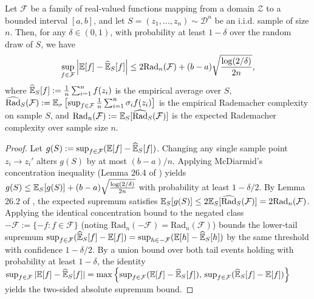 \begin{theorem}\label{thm:rademacher_gen}
Let $\mathcal{F}$ be a family of real-valued functions mapping from a domain $\mathcal{Z}$ to a bounded interval $[a, b]$, and let $S = (z_1, \dots, z_n) \sim \mathcal{D}^n$ be an i.i.d. sample of size $n$. Then, for any $\delta \in (0,1)$, with probability at least $1-\delta$ over the random draw of $S$, we have
\begin{equation*}
    \sup_{f \in \mathcal{F}} \left| \mathbb{E}[f] - \widehat{\mathbb{E}}_S[f] \right| \le 2\mathrm{Rad}_n(\mathcal{F}) + (b-a)\sqrt{\frac{\log(2/\delta)}{2n}},
\end{equation*}
where $\widehat{\mathbb{E}}_S[f] := \frac{1}{n}\sum_{i=1}^n f(z_i)$ is the empirical average over $S$, $\widehat{\mathrm{Rad}}_S(\mathcal{F}) := \mathbb{E}_{\sigma}\left[ \sup_{f \in \mathcal{F}} \frac{1}{n}\sum_{i=1}^n \sigma_i f(z_i) \right]$ is the empirical Rademacher complexity on sample $S$, and $\mathrm{Rad}_n(\mathcal{F}) := \mathbb{E}_S[\widehat{\mathrm{Rad}}_S(\mathcal{F})]$ is the expected Rademacher complexity over sample size $n$.
\end{theorem}
\begin{proof}
Let $g(S) := \sup_{f \in \mathcal{F}} (\mathbb{E}[f] - \widehat{\mathbb{E}}_S[f])$. Changing any single sample point $z_i \to z_i'$ alters $g(S)$ by at most $(b-a)/n$. Applying McDiarmid's concentration inequality (Lemma 26.4 of \citealp{shalevshwartz2014understanding}) yields $g(S) \le \mathbb{E}_S[g(S)] + (b-a)\sqrt{\frac{\log(2/\delta)}{2n}}$ with probability at least $1-\delta/2$. By Lemma 26.2 of \citealp{shalevshwartz2014understanding}, the expected supremum satisfies $\mathbb{E}_S[g(S)] \le 2 \mathbb{E}_S[\widehat{\mathrm{Rad}}_S(\mathcal{F})] = 2\mathrm{Rad}_n(\mathcal{F})$. Applying the identical concentration bound to the negated class $-\mathcal{F} := \{-f : f \in \mathcal{F}\}$ (noting $\mathrm{Rad}_n(-\mathcal{F}) = \mathrm{Rad}_n(\mathcal{F})$) bounds the lower-tail supremum $\sup_{f \in \mathcal{F}} (\widehat{\mathbb{E}}_S[f] - \mathbb{E}[f]) = \sup_{h \in -\mathcal{F}} (\mathbb{E}[h] - \widehat{\mathbb{E}}_S[h])$ by the same threshold with confidence $1-\delta/2$. By a union bound over both tail events holding with probability at least $1-\delta$, the identity $\sup_{f \in \mathcal{F}} |\mathbb{E}[f] - \widehat{\mathbb{E}}_S[f]| = \max\left\{ \sup_{f \in \mathcal{F}} (\mathbb{E}[f] - \widehat{\mathbb{E}}_S[f]), \, \sup_{f \in \mathcal{F}} (\widehat{\mathbb{E}}_S[f] - \mathbb{E}[f]) \right\}$ yields the two-sided absolute supremum bound.
\end{proof}

